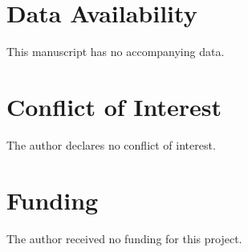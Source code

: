 \documentclass[12pt]{article}
\theoremstyle{plain}
\theoremstyle{definition}
\begin{document}
\section*{Data Availability}
This manuscript has no accompanying data.

\section*{Conflict of Interest}
The author declares no conflict of interest.

\section*{Funding}
The author received no funding for this project.



\end{document}

